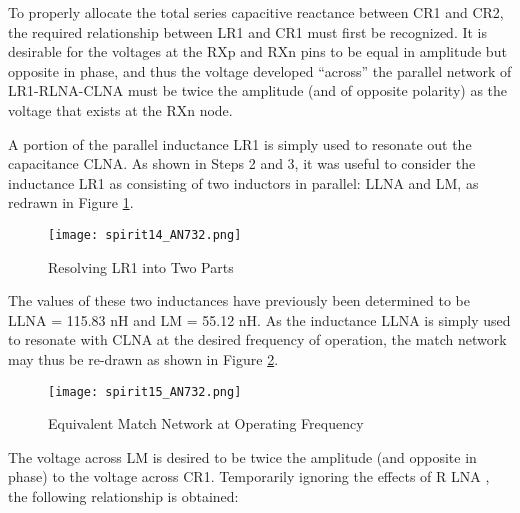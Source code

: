         To properly allocate the total series capacitive reactance between CR1 and CR2, the 
        required relationship between LR1 and CR1 must first be recognized. It is desirable for the 
        voltages at the RXp and RXn pins to be equal in amplitude but opposite in phase, and thus 
        the voltage developed “across” the parallel network of LR1-RLNA-CLNA must be twice the 
        amplitude (and of opposite polarity) as the voltage that exists at the RXn node.
        
        A portion of the parallel inductance LR1 is simply used to resonate out the capacitance 
        CLNA. As shown in Steps 2 and 3, it was useful to consider the inductance LR1 as consisting 
        of two inductors in parallel: LLNA and LM, as redrawn in Figure \ref{EXP001:fig_spirit14}.
        
        \begin{figure}[ht!] %
          \centering
          \texttt{[image: spirit14\_AN732.png]}
          \caption{Resolving LR1 into Two Parts \cite[s.~9]{AN643SiliconLabs}}
          \label{EXP001:fig_spirit14}
        \end{figure}
        
        The values of these two inductances have previously been determined to be LLNA = 115.83 nH 
        and LM = 55.12 nH. As the inductance LLNA is simply used to resonate with CLNA at the 
        desired frequency of operation, the match network may thus be re-drawn as shown in Figure 
        \ref{EXP001:fig_spirit15}.

        \begin{figure}[ht!] %
          \centering
          \texttt{[image: spirit15\_AN732.png]}
          \caption{Equivalent Match Network at Operating Frequency \cite[s.~10]{AN643SiliconLabs}}
          \label{EXP001:fig_spirit15}
        \end{figure}
        
        The voltage across LM is desired to be twice the amplitude (and opposite in phase) to the 
        voltage across CR1. Temporarily ignoring the effects of R LNA , the following relationship 
        is obtained:
        
